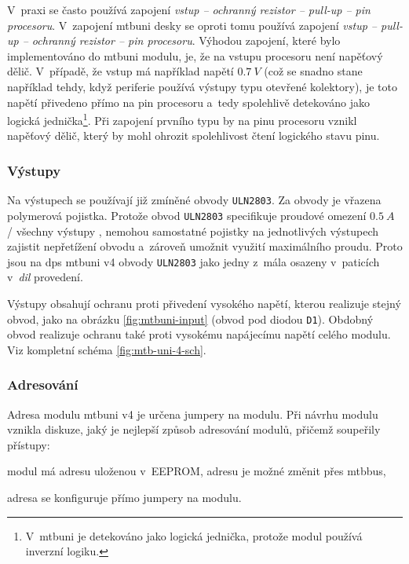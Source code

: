 V~praxi se často používá zapojení \textit{vstup – ochranný rezistor – pull-up –
pin procesoru}. V~zapojení \gls{mtbuni} desky se oproti tomu používá zapojení
\textit{vstup – pull-up – ochranný rezistor – pin procesoru}. Výhodou zapojení,
které bylo implementováno do \gls{mtbuni} modulu, je, že na vstupu procesoru
není napěťový dělič. V~případě, že vstup má například napětí $0.7~V$ (což se
snadno stane například tehdy, když periferie používá výstupy typu otevřené
kolektory), je toto napětí přivedeno přímo na pin procesoru a~tedy spolehlivě
detekováno jako logická jednička\footnote{V~\gls{mtbuni} je detekováno
jako logická jednička, protože modul používá inverzní logiku.}. Při zapojení
prvního typu by na pinu procesoru vznikl napěťový dělič, který by mohl ohrozit
spolehlivost čtení logického stavu pinu.

\subsubsection{Výstupy}

Na výstupech se používají již zmíněné obvody \texttt{ULN2803}. Za obvody
je vřazena polymerová pojistka. Protože obvod \texttt{ULN2803} specifikuje
proudové omezení $0.5~A$ / všechny výstupy \cite{uln2803-datasheet}, nemohou
samostatné pojistky na jednotlivých výstupech zajistit nepřetížení obvodu
a~zároveň umožnit využití maximálního proudu. Proto jsou na \gls{dps}
\gls{mtbuni} v4 obvody \texttt{ULN2803} jako jedny z~mála osazeny v~paticích
v~\textit{\gls{dil}} provedení.

Výstupy obsahují ochranu proti přivedení vysokého napětí, kterou realizuje
stejný obvod, jako na obrázku \ref{fig:mtbuni-input} (obvod pod diodou
\texttt{D1}). Obdobný obvod realizuje ochranu také proti vysokému napájecímu
napětí celého modulu. Viz kompletní schéma \ref{fig:mtb-uni-4-sch}.

\subsubsection{Adresování}

Adresa modulu \gls{mtbuni} v4 je určena jumpery na modulu. Při návrhu modulu
vznikla diskuze, jaký je nejlepší způsob adresování modulů, přičemž soupeřily
přístupy:

\begin{compactenum}
\item modul má adresu uloženou v~EEPROM, adresu je možné změnit přes \gls{mtbbus},
\item adresa se konfiguruje přímo jumpery na modulu.
\end{compactenum}

